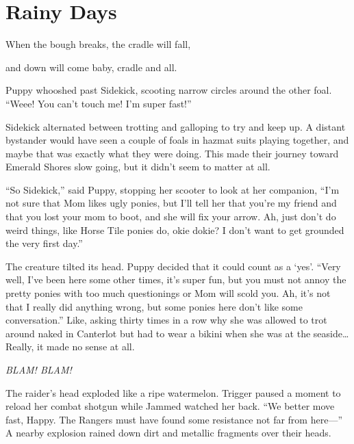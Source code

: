 
\chapter{Rainy Days}


\begin{intro}
When the bough breaks, the cradle will fall,

and down will come baby, cradle and all.
\end{intro}



Puppy whooshed past Sidekick, scooting narrow circles around the other foal. ``Weee! You can't touch me! I'm super fast!''

Sidekick alternated between trotting and galloping to try and keep up. A distant bystander would have seen a couple of foals in hazmat suits playing together, and maybe that was exactly what they were doing. This made their journey toward Emerald Shores slow going, but it didn't seem to matter at all.

``So Sidekick,'' said Puppy, stopping her scooter to look at her companion, ``I'm not sure that Mom likes ugly ponies, but I'll tell her that you're my friend and that you lost your mom to boot, and she will fix your arrow. Ah, just don't do weird things, like Horse Tile ponies do, okie dokie? I don't want to get grounded the very first day.''

The creature tilted its head. Puppy decided that it could count as a `yes'. ``Very well, I've been here some other times, it's super fun, but you must not annoy the pretty ponies with too much questionings or Mom will scold you. Ah, it's not that I really did anything wrong, but some ponies here don't like some conversation.'' Like, asking thirty times in a row why she was allowed to trot around naked in Canterlot but had to wear a bikini when she was at the seaside\dots Really, it made no sense at all.



\horizonline


\emph{BLAM! BLAM!}

The raider's head exploded like a ripe watermelon. Trigger paused a moment to reload her combat shotgun while Jammed watched her back. ``We better move fast, Happy. The Rangers must have found some resistance not far from here---'' A nearby explosion rained down dirt and metallic fragments over their heads.

